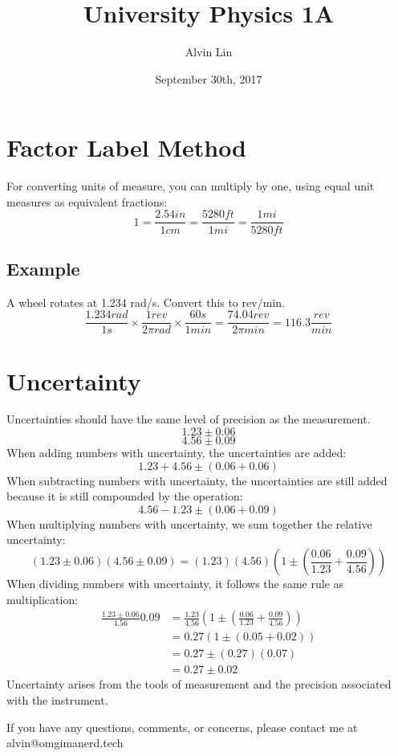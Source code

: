 \documentclass[letterpaper, 12pt]{math}
\title{University Physics 1A}
\author{Alvin Lin}
\date{September 30th, 2017}
\begin{document}
\maketitle

\section*{Factor Label Method}
For converting units of measure, you can multiply by one, using equal unit
measures as equivalent fractions:
\[ 1 = \frac{2.54in}{1cm} = \frac{5280ft}{1mi} = \frac{1mi}{5280ft} \]

\subsection*{Example}
A wheel rotates at 1.234 rad/s. Convert this to rev/min.
\[ \frac{1.234rad}{1s}\times\frac{1rev}{2\pi rad}\times\frac{60s}{1min} =
  \frac{74.04rev}{2\pi min} = 116.3\frac{rev}{min} \]

\section*{Uncertainty}
Uncertainties should have the same level of precision as the measurement.
\[ 1.23\pm0.06 \]
\[ 4.56\pm0.09 \]
When adding numbers with uncertainty, the uncertainties are added:
\[ 1.23+4.56\pm(0.06+0.06) \]
When subtracting numbers with uncertainty, the uncertainties are still
added because it is still compounded by the operation:
\[ 4.56-1.23\pm(0.06+0.09) \]
When multiplying numbers with uncertainty, we sum together the relative
uncertainty:
\[ (1.23\pm0.06)(4.56\pm0.09) =
  (1.23)(4.56)(1\pm(\frac{0.06}{1.23}+\frac{0.09}{4.56})) \]
When dividing numbers with uncertainty, it follows the same rule as
multiplication:
\begin{align*}
  \frac{1.23\pm0.06}{4.56}{0.09} &=
    \frac{1.23}{4.56}(1\pm(\frac{0.06}{1.23}+\frac{0.09}{4.56})) \\
  &= 0.27(1\pm(0.05+0.02)) \\
  &= 0.27\pm(0.27)(0.07) \\
  &= 0.27\pm0.02
\end{align*}
Uncertainty arises from the tools of measurement and the precision associated
with the instrument.

\begin{center}
  If you have any questions, comments, or concerns, please contact me at
  alvin@omgimanerd.tech
\end{center}
\end{document}
